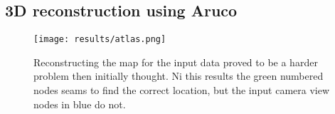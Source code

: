 \subsection{3D reconstruction using Aruco}%
\label{sub:res:3drec}
\begin{figure}
\begin{center}
    \texttt{[image: results/atlas.png]}
\end{center}
\caption{Reconstructing the map for the input data proved to be a harder problem then initially thought. Ni this results the green numbered nodes seams to find the correct location, but the input camera view nodes in blue do not.}
\label{fig:results:mapreconstruction}
\end{figure}


